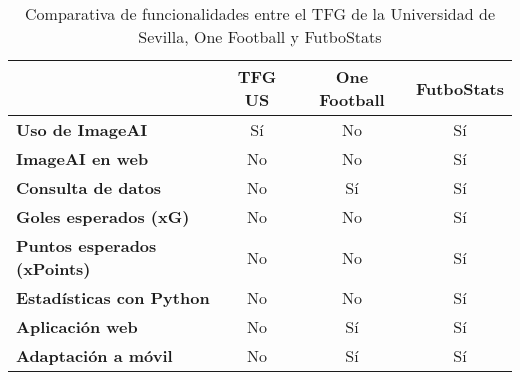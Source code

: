 
\begin{table}[h]
\centering
\begin{tabular}{|l|c|c|c|}
\hline
\textbf{} & \textbf{TFG US} & \textbf{One Football} & \textbf{FutboStats} \\ \hline
\textbf{Uso de ImageAI} & \cellcolor{lightgreen} Sí & \cellcolor{lightred} No & \cellcolor{lightgreen} Sí \\ \hline
\textbf{ImageAI en web} & \cellcolor{lightred} No & \cellcolor{lightred} No & \cellcolor{lightgreen} Sí \\ \hline
\textbf{Consulta de datos} & \cellcolor{lightred} No & \cellcolor{lightgreen} Sí & \cellcolor{lightgreen} Sí \\ \hline
\textbf{Goles esperados (xG)} & \cellcolor{lightred} No & \cellcolor{lightred} No & \cellcolor{lightgreen} Sí \\ \hline
\textbf{Puntos esperados (xPoints)} & \cellcolor{lightred} No & \cellcolor{lightred} No & \cellcolor{lightgreen} Sí \\ \hline
\textbf{Estadísticas con Python} & \cellcolor{lightred} No & \cellcolor{lightred} No & \cellcolor{lightgreen} Sí \\ \hline
\textbf{Aplicación web} & \cellcolor{lightred} No & \cellcolor{lightgreen} Sí & \cellcolor{lightgreen} Sí \\ \hline
\textbf{Adaptación a móvil} & \cellcolor{lightred} No & \cellcolor{lightgreen} Sí & \cellcolor{lightgreen} Sí \\ \hline
\end{tabular}
\caption{Comparativa de funcionalidades entre el TFG de la Universidad de Sevilla, One Football y FutboStats}
\label{table:comparativa}
\end{table}





